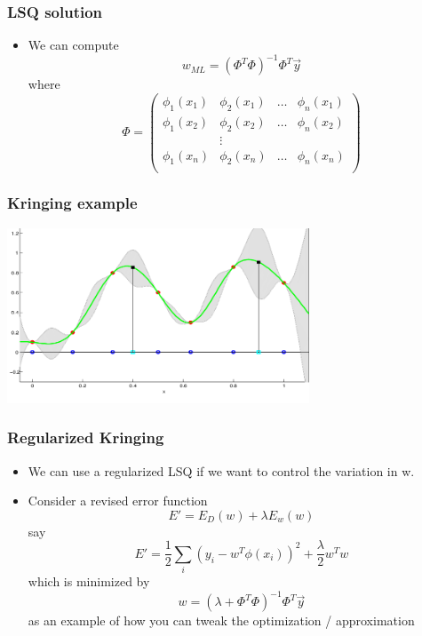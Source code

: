 \documentclass[10pt]{beamer}
\begin{document}
\begin{frame}
  \frametitle{LSQ solution}
  \begin{itemize}
  \item We can compute
    \[
      w_{ML} = (\Phi^T \Phi)^{-1} \Phi^T \vec{y}
    \]
    where
    \[
      \Phi = \left(
        \begin{array}{cccc}
          \phi_1(x_1) & \phi_2(x_1) & \ldots & \phi_n(x_1) \\
          \phi_1(x_2) & \phi_2(x_2) & \ldots & \phi_n(x_2) \\
                      & \vdots      &        &             \\
          \phi_1(x_n) & \phi_2(x_n) & \ldots & \phi_n(x_n) \\
        \end{array} \right)
      \]
  \end{itemize}
\end{frame}

\begin{frame}
  \frametitle{Kringing example}
  \begin{center}
      \includegraphics[width=9cm]{kringing-1d-example}
  \end{center}
\end{frame}

\begin{frame}
  \frametitle{Regularized Kringing}
  \begin{itemize}
  \item We can use a regularized LSQ if we want to control the variation in w. 
  \item Consider a revised error function
    \[ E' = E_D(w) + \lambda E_w(w) \] say
    \[ E' = \frac{1}{2} \sum_i (y_i - w^T\phi(x_i))^2 + \frac{\lambda}{2} w^T w \]
    which is minimized by
    \[
      w = (\lambda + \Phi^T \Phi)^{-1} \Phi^T \vec{y}
    \]
    as an example of how you can tweak the optimization / approximation    
  \end{itemize}
\end{frame}
\end{document}

